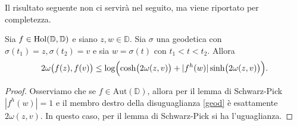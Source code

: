 Il risultato seguente non ci servirà nel seguito, ma viene riportato per completezza.

\begin{cor} \label{35}
  Sia $f \in \normalfont{\text{Hol}}(\mathbb{D},\mathbb{D})$ e siano $z, w \in \mathbb{D}$. Sia $\sigma$ una geodetica con $\sigma(t_1)=z, \sigma(t_2)=v$ e sia $w=\sigma(t)$ con $t_1<t<t_2$. Allora
  \begin{equation} \label{geod}
    2\omega\bigl(f(z),f(v)\bigr) \le \log\Bigl(\cosh\bigl(2\omega(z,v)\bigr)+|f^h(w)|\sinh\bigl(2\omega(z,v)\bigr)\Bigr).
  \end{equation}
\end{cor}
\begin{proof}
  Osserviamo che se $f \in \text{Aut}(\mathbb{D})$, allora per il lemma di Schwarz-Pick $|f^h(w)|=1$ e il membro destro della disuguaglianza \eqref{geod} è esattamente $2\omega(z,v)$. In questo caso, per il lemma di Schwarz-Pick si ha l'uguaglianza.


\end{proof}
